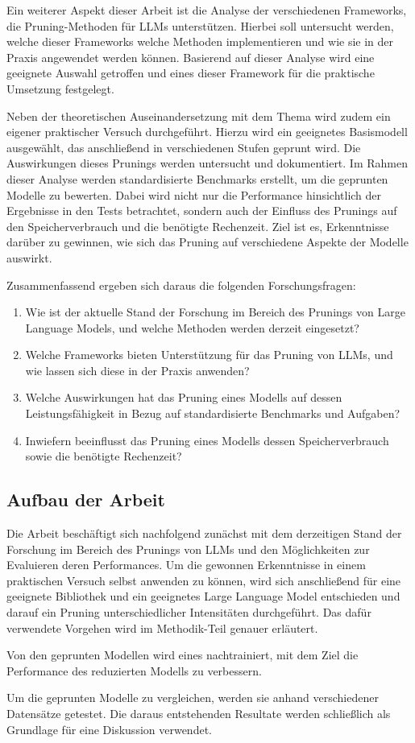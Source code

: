 Ein weiterer Aspekt dieser Arbeit ist die Analyse der verschiedenen Frameworks,
die Pruning-Methoden für LLMs unterstützen. Hierbei soll untersucht werden,
welche dieser Frameworks welche Methoden implementieren und wie sie in der
Praxis angewendet werden können. Basierend auf dieser Analyse wird eine
geeignete Auswahl getroffen und eines dieser Framework für die praktische
Umsetzung festgelegt.

Neben der theoretischen Auseinandersetzung mit dem Thema wird zudem ein eigener
praktischer Versuch durchgeführt. Hierzu wird ein geeignetes Basismodell
ausgewählt, das anschließend in verschiedenen Stufen geprunt wird. Die
Auswirkungen dieses Prunings werden untersucht und dokumentiert. Im Rahmen
dieser Analyse werden standardisierte Benchmarks erstellt, um die geprunten
Modelle zu bewerten. Dabei wird nicht nur die Performance hinsichtlich der
Ergebnisse in den Tests betrachtet, sondern auch der Einfluss des Prunings auf
den Speicherverbrauch und die benötigte Rechenzeit. Ziel ist es, Erkenntnisse
darüber zu gewinnen, wie sich das Pruning auf verschiedene Aspekte der Modelle
auswirkt.

Zusammenfassend ergeben sich daraus die folgenden Forschungsfragen:

\begin{enumerate}
	\item Wie ist der aktuelle Stand der Forschung im Bereich des
	      Prunings von Large Language Models, und welche Methoden werden derzeit
	      eingesetzt?
	\item Welche Frameworks bieten Unterstützung für das Pruning von
	      LLMs, und wie lassen sich diese in der Praxis anwenden?
	\item Welche
	      Auswirkungen hat das Pruning eines Modells auf dessen Leistungsfähigkeit in
	      Bezug auf standardisierte Benchmarks und Aufgaben?
	\item Inwiefern
	      beeinflusst das Pruning eines Modells dessen Speicherverbrauch sowie die
	      benötigte Rechenzeit?
\end{enumerate}


\subsection{Aufbau der Arbeit}

Die Arbeit beschäftigt sich nachfolgend zunächst mit dem derzeitigen Stand der
Forschung im Bereich des Prunings von LLMs und den Möglichkeiten zur Evaluieren
deren Performances. Um die gewonnen Erkenntnisse in einem praktischen Versuch
selbst anwenden zu können, wird sich anschließend für eine geeignete Bibliothek
und ein geeignetes Large Language Model entschieden und darauf ein Pruning
unterschiedlicher Intensitäten durchgeführt. Das dafür verwendete Vorgehen wird
im Methodik-Teil genauer erläutert.

Von den geprunten Modellen wird eines nachtrainiert, mit dem Ziel die
Performance des reduzierten Modells zu verbessern.

Um die geprunten Modelle zu vergleichen, werden sie anhand verschiedener
Datensätze getestet. Die daraus entstehenden Resultate werden schließlich als
Grundlage für eine Diskussion verwendet.
